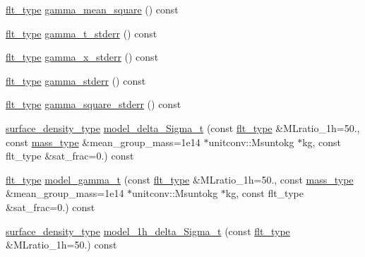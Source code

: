 \begin{DoxyCompactItemize}
\hyperlink{lib_2IceBRG__main_2common_8h_ad0f130a56eeb944d9ef2692ee881ecc4}{flt\-\_\-type} \hyperlink{classIceBRG_1_1pair__bin__summary_ae6e61497643df44dfb882614f4f8a436}{gamma\-\_\-mean\-\_\-square} () const 
\item 
\hyperlink{lib_2IceBRG__main_2common_8h_ad0f130a56eeb944d9ef2692ee881ecc4}{flt\-\_\-type} \hyperlink{classIceBRG_1_1pair__bin__summary_ac4b6d240243c897ce0bda3ccec204901}{gamma\-\_\-t\-\_\-stderr} () const 
\item 
\hyperlink{lib_2IceBRG__main_2common_8h_ad0f130a56eeb944d9ef2692ee881ecc4}{flt\-\_\-type} \hyperlink{classIceBRG_1_1pair__bin__summary_a8bfdc933188bc3253991fe257f0859b1}{gamma\-\_\-x\-\_\-stderr} () const 
\item 
\hyperlink{lib_2IceBRG__main_2common_8h_ad0f130a56eeb944d9ef2692ee881ecc4}{flt\-\_\-type} \hyperlink{classIceBRG_1_1pair__bin__summary_a0a02c950a58cc6844328266f8bc2c1fb}{gamma\-\_\-stderr} () const 
\item 
\hyperlink{lib_2IceBRG__main_2common_8h_ad0f130a56eeb944d9ef2692ee881ecc4}{flt\-\_\-type} \hyperlink{classIceBRG_1_1pair__bin__summary_ad2176d6b62e4c8cf70592252ae106d70}{gamma\-\_\-square\-\_\-stderr} () const 
\item 
\hyperlink{namespaceIceBRG_a80c597ef5ba0a32491d32a9f0083b02d}{surface\-\_\-density\-\_\-type} \hyperlink{classIceBRG_1_1pair__bin__summary_a4c15fe2fea325cc093bcd826658377c4}{model\-\_\-delta\-\_\-\-Sigma\-\_\-t} (const \hyperlink{lib_2IceBRG__main_2common_8h_ad0f130a56eeb944d9ef2692ee881ecc4}{flt\-\_\-type} \&M\-Lratio\-\_\-1h=50., const \hyperlink{namespaceIceBRG_a1be72ac4918a9b029f2eefa084213e35}{mass\-\_\-type} \&mean\-\_\-group\-\_\-mass=1e14 $\ast$unitconv\-::\-Msuntokg $\ast$kg, const flt\-\_\-type \&sat\-\_\-frac=0.) const 
\item 
\hyperlink{lib_2IceBRG__main_2common_8h_ad0f130a56eeb944d9ef2692ee881ecc4}{flt\-\_\-type} \hyperlink{classIceBRG_1_1pair__bin__summary_aa49f4e7780a495607acbef6c74f2d33c}{model\-\_\-gamma\-\_\-t} (const \hyperlink{lib_2IceBRG__main_2common_8h_ad0f130a56eeb944d9ef2692ee881ecc4}{flt\-\_\-type} \&M\-Lratio\-\_\-1h=50., const \hyperlink{namespaceIceBRG_a1be72ac4918a9b029f2eefa084213e35}{mass\-\_\-type} \&mean\-\_\-group\-\_\-mass=1e14 $\ast$unitconv\-::\-Msuntokg $\ast$kg, const flt\-\_\-type \&sat\-\_\-frac=0.) const 
\item 
\hyperlink{namespaceIceBRG_a80c597ef5ba0a32491d32a9f0083b02d}{surface\-\_\-density\-\_\-type} \hyperlink{classIceBRG_1_1pair__bin__summary_adbc2af143460d725fcc07537517c5119}{model\-\_\-1h\-\_\-delta\-\_\-\-Sigma\-\_\-t} (const \hyperlink{lib_2IceBRG__main_2common_8h_ad0f130a56eeb944d9ef2692ee881ecc4}{flt\-\_\-type} \&M\-Lratio\-\_\-1h=50.) const 

\end{DoxyCompactItemize}
